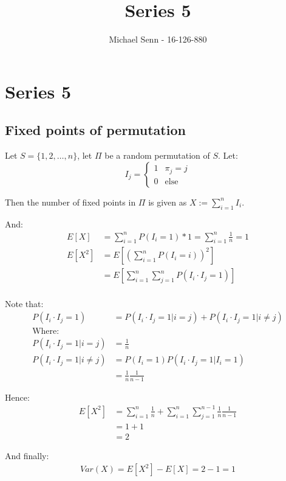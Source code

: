 \documentclass[a4paper]{scrreprt}
\title{Series 5}
\author{Michael Senn \maillink{michael.senn@students.unibe.ch} - 16-126-880}
\date{\printdate}
\begin{document}
\maketitle


\setcounter{chapter}{4}
\chapter{Series 5}

\section{Fixed points of permutation}

Let $S = \{1, 2, \ldots, n\}$, let $\Pi$ be a random permutation of $S$.
Let:
\[
	I_{j} =
	\begin{cases}
		1 & \pi_j = j \\
		0 & \text{else}
	\end{cases}
\]

Then the number of fixed points in $\Pi$ is given as $X := \sum_{i=1}^n{I_i}$.

And:
\begin{align*}
	E[X] & = \sum_{i=1}^n{P(I_i = 1) * 1} = \sum_{i=1}^n{\frac{1}{n}} = 1 \\
	E[X^2] & = E\left[\left(\sum_{i=1}^n{P(I_i = i)}\right)^2\right] \\
	       & = E\left[\sum_{i=1}^n{\sum_{j=1}^n{P(I_i \cdot I_j = 1)}}\right] \\
\end{align*}

Note that:
\begin{align*}
	P(I_i \cdot I_j = 1) & = P(I_i \cdot I_j = 1 | i = j) + P(I_i \cdot I_j = 1 | i \neq j) \\
	\text{Where}: \\
	P(I_i \cdot I_j = 1 | i = j) & = \frac{1}{n} \\
	P(I_i \cdot I_j = 1 | i \neq j) & = P(I_i = 1) P(I_i \cdot I_j = 1 | I_i = 1) \\
					& = \frac{1}{n} \frac{1}{n-1}
\end{align*}

Hence:
\begin{align*}
	E[X^2] & = \sum_{i=1}^n{\frac{1}{n}} + \sum_{i=1}^n{\sum_{j=1}^{n-1}{\frac{1}{n} \frac{1}{n-1}}} \\
	& = 1 + 1 \\
	& = 2
\end{align*}

And finally:
\begin{align*}
	Var(X) = E[X^2] - E[X] = 2 - 1 = 1
\end{align*}
\end{document}
